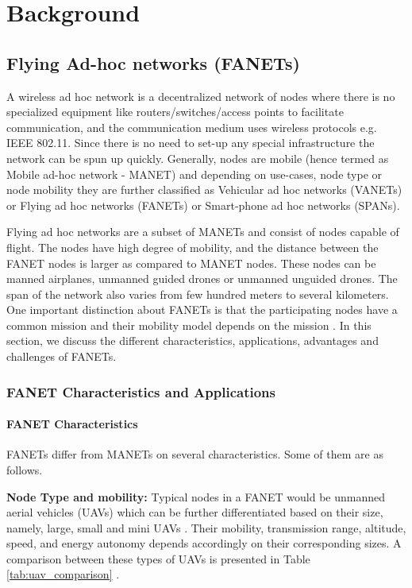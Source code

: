 \chapter{Background}
\label{chap-two}

\section{Flying Ad-hoc networks (FANETs)}

A wireless ad hoc network is a decentralized network of nodes where there is no specialized equipment like routers/switches/access points to facilitate communication, and the communication medium uses wireless protocols e.g. IEEE 802.11. Since there is no need to set-up any special infrastructure the network can be spun up quickly. Generally, nodes are mobile (hence termed as Mobile ad-hoc network - MANET) and depending on use-cases, node type or node mobility they are further classified as Vehicular ad hoc networks (VANETs) or Flying ad hoc networks (FANETs) or Smart-phone ad hoc networks (SPANs).

Flying ad hoc networks are a subset of MANETs and consist of nodes capable of flight. The nodes have high degree of mobility, and the distance between the FANET nodes is larger as compared to MANET nodes. These nodes can be manned airplanes, unmanned guided drones or unmanned unguided drones. The span of the network also varies from few hundred meters to several kilometers. One important distinction about FANETs is that the participating nodes have a common mission and their mobility model depends on the mission \cite{OUBBATI201729}. In this section, we discuss the different characteristics, applications, advantages and challenges of FANETs.

\subsection{FANET Characteristics and Applications}

\subsubsection{FANET Characteristics}
FANETs differ from MANETs on several characteristics. Some of them are as follows.

\textbf{Node Type and mobility:} Typical nodes in a FANET would be unmanned aerial vehicles (UAVs) which can be further differentiated based on their size, namely, large, small and mini UAVs \cite{OUBBATI201729}. Their mobility, transmission range, altitude, speed, and energy autonomy depends accordingly on their corresponding sizes. A comparison between these types of UAVs is presented in Table \ref{tab:uav_comparison} \cite{OUBBATI201729}.

